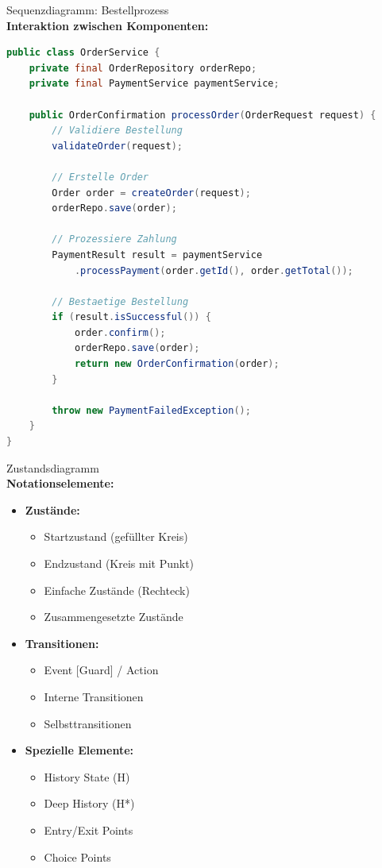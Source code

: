 \begin{example2}{Sequenzdiagramm: Bestellprozess}\\
\textbf{Interaktion zwischen Komponenten:}

\begin{lstlisting}[language=Java, style=basesmol]
public class OrderService {
    private final OrderRepository orderRepo;
    private final PaymentService paymentService;
    
    public OrderConfirmation processOrder(OrderRequest request) {
        // Validiere Bestellung
        validateOrder(request);
        
        // Erstelle Order
        Order order = createOrder(request);
        orderRepo.save(order);
        
        // Prozessiere Zahlung
        PaymentResult result = paymentService
            .processPayment(order.getId(), order.getTotal());
            
        // Bestaetige Bestellung
        if (result.isSuccessful()) {
            order.confirm();
            orderRepo.save(order);
            return new OrderConfirmation(order);
        }
        
        throw new PaymentFailedException();
    }
}
\end{lstlisting}
\end{example2}

\begin{definition}{Zustandsdiagramm}\\
\textbf{Notationselemente:}
\begin{itemize}
    \item \textbf{Zustände:}
    \begin{itemize}
        \item Startzustand (gefüllter Kreis)
        \item Endzustand (Kreis mit Punkt)
        \item Einfache Zustände (Rechteck)
        \item Zusammengesetzte Zustände
    \end{itemize}
    
    \item \textbf{Transitionen:}
    \begin{itemize}
        \item Event [Guard] / Action
        \item Interne Transitionen
        \item Selbsttransitionen
    \end{itemize}
    
    \item \textbf{Spezielle Elemente:}
    \begin{itemize}
        \item History State (H)
        \item Deep History (H*)
        \item Entry/Exit Points
        \item Choice Points
    \end{itemize}
\end{itemize}
\end{definition}

